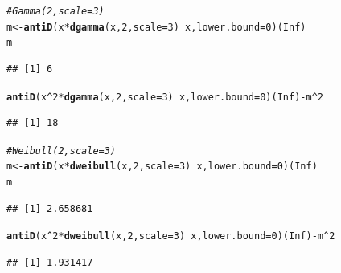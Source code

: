 \documentclass[twoside]{book}\usepackage[]{graphicx}\usepackage[]{xcolor}
\makeatletter
\newcommand{\hlnum}[1]{\textcolor[rgb]{0.686,0.059,0.569}{#1}}%
\newcommand{\hlcom}[1]{\textcolor[rgb]{0.678,0.584,0.686}{\textit{#1}}}%
\newcommand{\hlopt}[1]{\textcolor[rgb]{0,0,0}{#1}}%
\newcommand{\hlstd}[1]{\textcolor[rgb]{0.345,0.345,0.345}{#1}}%
\newcommand{\hlkwb}[1]{\textcolor[rgb]{0.69,0.353,0.396}{#1}}%
\newcommand{\hlkwc}[1]{\textcolor[rgb]{0.333,0.667,0.333}{#1}}%
\newcommand{\hlkwd}[1]{\textcolor[rgb]{0.737,0.353,0.396}{\textbf{#1}}}%
\newenvironment{kframe}{%
 \def\at@end@of@kframe{}%
 \ifinner\ifhmode%
  \def\at@end@of@kframe{\end{minipage}}%
  \begin{minipage}{\columnwidth}%
 \fi\fi%
 \def\FrameCommand##1{\hskip\@totalleftmargin \hskip-\fboxsep
 \colorbox{shadecolor}{##1}\hskip-\fboxsep
     \hskip-\linewidth \hskip-\@totalleftmargin \hskip\columnwidth}%
 \MakeFramed {\advance\hsize-\width
   \@totalleftmargin\z@ \linewidth\hsize
   \@setminipage}}%
 {\par\unskip\endMakeFramed%
 \at@end@of@kframe}
\newenvironment{knitrout}{}{} %
\makeatother
\begin{document}
\begin{solution}
\begin{knitrout}
\begin{kframe}
\begin{alltt}
\hlcom{# Gamma(2,scale=3)}
\hlstd{m} \hlkwb{<-} \hlkwd{antiD}\hlstd{(x} \hlopt{*} \hlkwd{dgamma}\hlstd{(x,} \hlnum{2}\hlstd{,} \hlkwc{scale} \hlstd{=} \hlnum{3}\hlstd{)} \hlopt{~} \hlstd{x,} \hlkwc{lower.bound} \hlstd{=} \hlnum{0}\hlstd{)(}\hlnum{Inf}\hlstd{)}
\hlstd{m}
\end{alltt}
\begin{verbatim}
## [1] 6
\end{verbatim}
\begin{alltt}
\hlkwd{antiD}\hlstd{(x}\hlopt{^}\hlnum{2} \hlopt{*} \hlkwd{dgamma}\hlstd{(x,} \hlnum{2}\hlstd{,} \hlkwc{scale} \hlstd{=} \hlnum{3}\hlstd{)} \hlopt{~} \hlstd{x,} \hlkwc{lower.bound} \hlstd{=} \hlnum{0}\hlstd{)(}\hlnum{Inf}\hlstd{)} \hlopt{-} \hlstd{m}\hlopt{^}\hlnum{2}
\end{alltt}
\begin{verbatim}
## [1] 18
\end{verbatim}
\end{kframe}
\end{knitrout}
\begin{knitrout}
\color{fgcolor}\begin{kframe}
\begin{alltt}
\hlcom{# Weibull(2,scale=3)}
\hlstd{m} \hlkwb{<-} \hlkwd{antiD}\hlstd{(x} \hlopt{*} \hlkwd{dweibull}\hlstd{(x,} \hlnum{2}\hlstd{,} \hlkwc{scale} \hlstd{=} \hlnum{3}\hlstd{)} \hlopt{~} \hlstd{x,} \hlkwc{lower.bound} \hlstd{=} \hlnum{0}\hlstd{)(}\hlnum{Inf}\hlstd{)}
\hlstd{m}
\end{alltt}
\begin{verbatim}
## [1] 2.658681
\end{verbatim}
\begin{alltt}
\hlkwd{antiD}\hlstd{(x}\hlopt{^}\hlnum{2} \hlopt{*} \hlkwd{dweibull}\hlstd{(x,} \hlnum{2}\hlstd{,} \hlkwc{scale} \hlstd{=} \hlnum{3}\hlstd{)} \hlopt{~} \hlstd{x,} \hlkwc{lower.bound} \hlstd{=} \hlnum{0}\hlstd{)(}\hlnum{Inf}\hlstd{)} \hlopt{-} \hlstd{m}\hlopt{^}\hlnum{2}
\end{alltt}
\begin{verbatim}
## [1] 1.931417
\end{verbatim}
\end{kframe}
\end{knitrout}
\end{solution}
\end{document}
